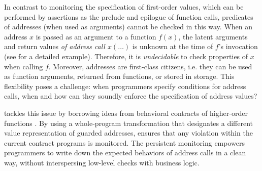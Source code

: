 In contrast to monitoring the specification of first-order values, 
which can be performed by assertions as the prelude and epilogue of function calls,
predicates of addresses (when used as arguments) cannot be checked in this way.
When an address $x$ is passed as an argument to a function $f(x)$, 
the latent arguments and return values \emph{of address call $x(\dots)$} is unknown at 
the time of $f$'s invocation (see  for a detailed example).
Therefore, it is \emph{undecidable} to check properties of $x$ when calling $f$.
Moreover, addresses are first-class citizens, i.e. they can be used
as function arguments, returned from functions, or stored in storage.
This flexibility poses a challenge: when programmers specify conditions for address calls, 
when and how can they soundly enforce the specification of address values?

\lang tackles this issue by borrowing ideas from behavioral contracts of higher-order functions \cite{DBLP:conf/icfp/FindlerF02}.
By using a whole-program transformation that designates a different
value representation of guarded addresses, \lang ensures 
that any violation within the current contract programs is monitored.
The persistent monitoring empowers programmers to write down the expected
behaviors of address calls in a clean way, without interspersing low-level checks
with business logic. 



\iffalse
Using a core language that models the essence of Solidity, \Cref{sec:model} 
gives the static semantics and translation semantics of \lang, and discusses 
the soundness of our approach. We also  briefly describe the implementation of \lang.
\xx{too detail}
\fi

